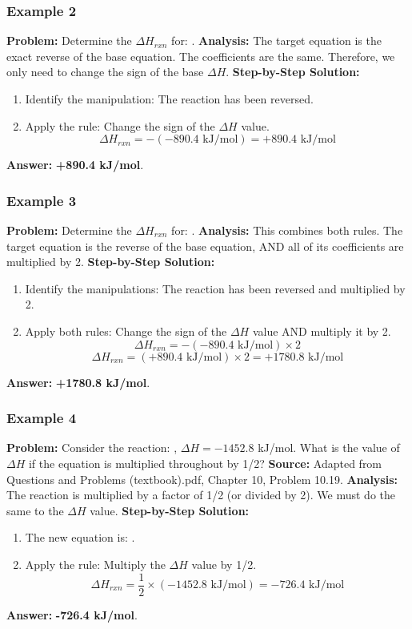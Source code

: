 \documentclass{article}
\begin{document}
\subsubsection{Example 2}
\textbf{Problem:} Determine the $\Delta H_{rxn}$ for: .
\textbf{Analysis:} The target equation is the exact reverse of the base equation. The coefficients are the same. Therefore, we only need to change the sign of the base $\Delta H$.
\textbf{Step-by-Step Solution:}
\begin{enumerate}
    \item Identify the manipulation: The reaction has been reversed.
    \item Apply the rule: Change the sign of the $\Delta H$ value.
    \[ \Delta H_{rxn} = -(-890.4 \text{ kJ/mol}) = +890.4 \text{ kJ/mol} \]
\end{enumerate}
\textbf{Answer:} \textbf{+890.4 kJ/mol}.

\subsubsection{Example 3}
\textbf{Problem:} Determine the $\Delta H_{rxn}$ for: .
\textbf{Analysis:} This combines both rules. The target equation is the reverse of the base equation, AND all of its coefficients are multiplied by 2.
\textbf{Step-by-Step Solution:}
\begin{enumerate}
    \item Identify the manipulations: The reaction has been reversed and multiplied by 2.
    \item Apply both rules: Change the sign of the $\Delta H$ value AND multiply it by 2.
    \[ \Delta H_{rxn} = -(-890.4 \text{ kJ/mol}) \times 2 \]
    \[ \Delta H_{rxn} = (+890.4 \text{ kJ/mol}) \times 2 = +1780.8 \text{ kJ/mol} \]
\end{enumerate}
\textbf{Answer:} \textbf{+1780.8 kJ/mol}.

\subsubsection{Example 4}
\textbf{Problem:} Consider the reaction: , $\Delta H = -1452.8$ kJ/mol. What is the value of $\Delta H$ if the equation is multiplied throughout by 1/2?
\textbf{Source:} Adapted from Questions and Problems (textbook).pdf, Chapter 10, Problem 10.19.
\textbf{Analysis:} The reaction is multiplied by a factor of 1/2 (or divided by 2). We must do the same to the $\Delta H$ value.
\textbf{Step-by-Step Solution:}
\begin{enumerate}
    \item The new equation is: .
    \item Apply the rule: Multiply the $\Delta H$ value by 1/2.
    \[ \Delta H_{rxn} = \frac{1}{2} \times (-1452.8 \text{ kJ/mol}) = -726.4 \text{ kJ/mol} \]
\end{enumerate}
\textbf{Answer:} \textbf{-726.4 kJ/mol}.
\end{document}
